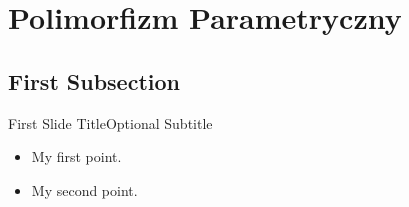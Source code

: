 \documentclass{beamer}
\begin{document}





\section{Polimorfizm Parametryczny}

\subsection{First Subsection}

\begin{frame}{First Slide Title}{Optional Subtitle}
  \begin{itemize}
  \item {
    My first point.
  }
  \item {
    My second point.
  }
  \end{itemize}
\end{frame}
\end{document}
